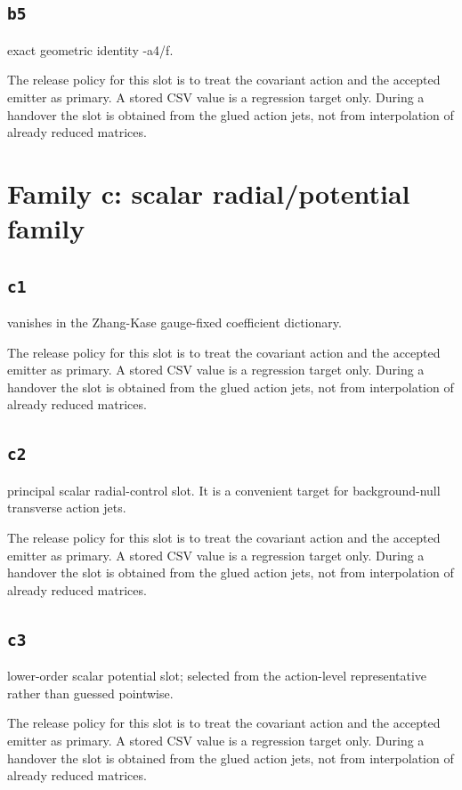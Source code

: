 \documentclass[11pt,a4paper,oneside]{book}
\begin{document}
\subsection{\texttt{b5}}
exact geometric identity -a4/f.

The release policy for this slot is to treat the covariant action and the accepted emitter as primary. A stored CSV value is a regression target only. During a handover the slot is obtained from the glued action jets, not from interpolation of already reduced matrices.\par

\section{Family c: scalar radial/potential family}
\subsection{\texttt{c1}}
vanishes in the Zhang-Kase gauge-fixed coefficient dictionary.

The release policy for this slot is to treat the covariant action and the accepted emitter as primary. A stored CSV value is a regression target only. During a handover the slot is obtained from the glued action jets, not from interpolation of already reduced matrices.\par

\subsection{\texttt{c2}}
principal scalar radial-control slot. It is a convenient target for background-null transverse action jets.

The release policy for this slot is to treat the covariant action and the accepted emitter as primary. A stored CSV value is a regression target only. During a handover the slot is obtained from the glued action jets, not from interpolation of already reduced matrices.\par

\subsection{\texttt{c3}}
lower-order scalar potential slot; selected from the action-level representative rather than guessed pointwise.

The release policy for this slot is to treat the covariant action and the accepted emitter as primary. A stored CSV value is a regression target only. During a handover the slot is obtained from the glued action jets, not from interpolation of already reduced matrices.\par
\end{document}
